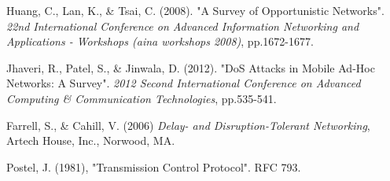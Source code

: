 \documentclass{article}
\begin{document}
\begin{thebibliography}{20}

Huang, C., Lan, K., \& Tsai, C. (2008). 
"A Survey of Opportunistic Networks". 
\textit{22nd International Conference on Advanced Information Networking and Applications - Workshops (aina workshops 2008)}, pp.1672-1677.

Jhaveri, R., Patel, S., \& Jinwala, D. (2012).
"DoS Attacks in Mobile Ad-Hoc Networks: A Survey".
\textit{2012 Second International Conference on Advanced Computing \& Communication Technologies}, pp.535-541.

Farrell, S., \& Cahill, V. (2006) \textit{Delay- and Disruption-Tolerant Networking}, Artech House, Inc., Norwood, MA.

Postel, J. (1981), "Transmission Control Protocol". RFC 793.


\end{thebibliography}
 
\end{document}
